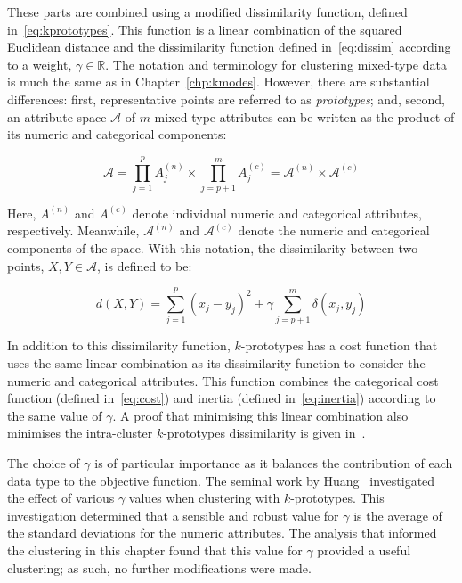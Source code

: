 These parts are combined using a modified dissimilarity function, defined
in~\eqref{eq:kprototypes}. This function is a linear combination of the squared
Euclidean distance and the dissimilarity function defined in~\eqref{eq:dissim}
according to a weight, \(\gamma \in \mathbb R\). The notation and terminology
for clustering mixed-type data is much the same as in Chapter~\ref{chp:kmodes}.
However, there are substantial differences: first, representative points are
referred to as \emph{prototypes}; and, second, an attribute space \(\mathcal A\)
of \(m\) mixed-type attributes can be written as the product of its numeric and
categorical components:

\begin{equation}
    \mathcal A
    = \prod_{j=1}^{p} A^{(n)}_j \times \prod_{j=p+1}^{m} A^{(c)}_j
    = \mathcal A^{(n)} \times \mathcal A^{(c)}
\end{equation}

Here, \(A^{(n)}\) and \(A^{(c)}\) denote individual numeric and categorical
attributes, respectively. Meanwhile, \(\mathcal A^{(n)}\) and \(\mathcal
A^{(c)}\) denote the numeric and categorical components of the space. With this
notation, the dissimilarity between two points, \(X, Y \in \mathcal A\), is
defined to be:

\begin{equation}\label{eq:kprototypes}
    d(X, Y) = \sum_{j=1}^{p} \left(x_j - y_j\right)^2 + \gamma \sum_{j=p+1}^{m}
    \delta \left(x_j, y_j\right)
\end{equation}



In addition to this dissimilarity function, \(k\)-prototypes has a cost function
that uses the same linear combination as its dissimilarity function to consider
the numeric and categorical attributes. This function combines the categorical
cost function (defined in~\eqref{eq:cost}) and inertia (defined
in~\eqref{eq:inertia}) according to the same value of \(\gamma\). A proof that
minimising this linear combination also minimises the intra-cluster
\(k\)-prototypes dissimilarity is given in~\cite{Huang1997a}.

The choice of \(\gamma\) is of particular importance as it balances the
contribution of each data type to the objective function. The seminal work by
Huang~\cite{Huang1997a} investigated the effect of various \(\gamma\) values
when clustering with \(k\)-prototypes. This investigation determined that a
sensible and robust value for \(\gamma\) is the average of the standard
deviations for the numeric attributes. The analysis that informed the clustering
in this chapter found that this value for \(\gamma\) provided a useful
clustering; as such, no further modifications were made.

